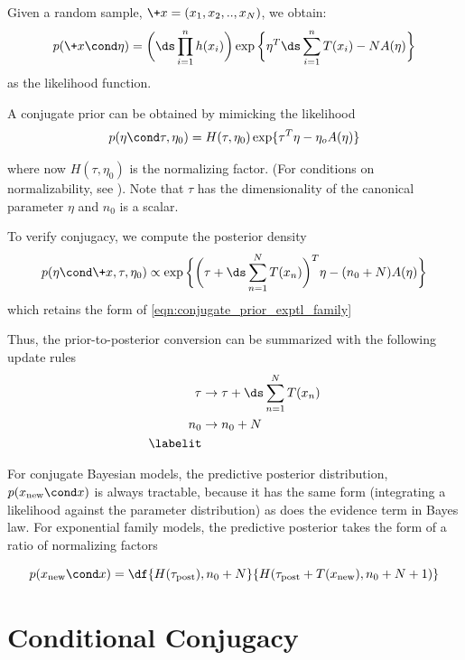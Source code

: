 \documentclass{article} %
\begin{document}
Given a random sample, $\+x=(x_1, x_2, .., x_N)$, we obtain:
\[ p(\+x \cond \eta) = \bigg( \ds\prod_{i=1}^n h(x_i)  \bigg) \exp \bigg\{ \eta^T  \ds\sum_{i=1}^n T(x_i) - N A(\eta) \bigg\} \]
as the likelihood function.

A conjugate prior can be obtained by mimicking the likelihood
\begin{equation}
p (\eta \cond \tau, \eta_0) = H(\tau, \eta_0) \exp \{ \tau^T \eta - \eta_o A(\eta)\}
\label{eqn:conjugate_prior_exptl_family}
\end{equation}

where now $H(\tau, \eta_0)$ is the normalizing factor.  (For conditions on normalizability, see \cite{jordan}).   Note that $\tau$ has the dimensionality of the canonical parameter $\eta$ and $n_0$ is a scalar.

To verify conjugacy, we compute the posterior density
\[ p (\eta \cond \+x, \tau, \eta_0)  \propto \exp \bigg\{ \bigg( \tau + \ds\sum_{n=1}^N  T(x_n) \bigg)^T \eta - (n_0 + N) A(\eta) \bigg\} \]
which retains the form of \eqref{eqn:conjugate_prior_exptl_family}

Thus, the prior-to-posterior conversion can be summarized with the following update rules
\begin{align*}
\tau & \to \tau + \ds\sum_{n=1}^N T(x_n) \\
n_0 & \to  n_0 + N \\
\labelit \label{eqn:general_formalism_prior_to_posterior_conversion}
\end{align*}

For conjugate Bayesian models, the predictive posterior distribution, $p(x_{\text{new}} \cond x)$ is always tractable, because it has the same form (integrating a likelihood against the parameter distribution) as does the evidence term in Bayes law.   For exponential family models, the predictive posterior takes the form of a ratio of normalizing factors

\begin{equation}
p(x_{\text{new}} \cond x) = \df{H(\tau_{\text{post}}), n_0 + N}{H(\tau_{\text{post}} + T(x_{\text{new}}), n_0 + N + 1)}
\label{eqn:predictive_posterior_exptl_family}
\end{equation}


\section{Conditional Conjugacy} \label{sec:exponential_family_conditional_conjugacy}
\end{document}
